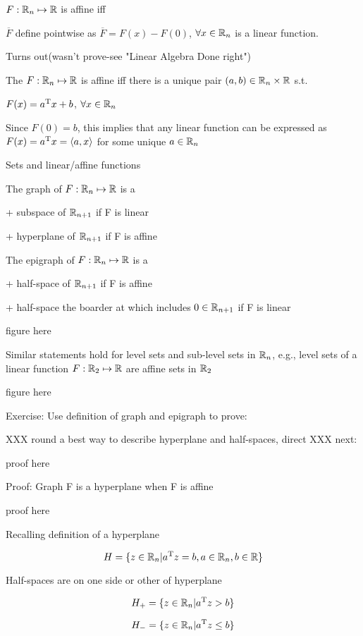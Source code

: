 $F:\mathbb{R}_{n}\mapsto\mathbb{R}$ is affine iff

$\overline{F}$ define pointwise as $\overline{F}=F(x)-F(0)$, $\forall x\in\mathbb{R}_{n}$ is a linear function.


Turns out(wasn't prove-see "Linear Algebra Done right")

The $F:\mathbb{R}_{n}\mapsto\mathbb{R}$ is affine iff there is a unique pair $(a,b)\in\mathbb{R}_{n}\times\mathbb{R}$  s.t. 

$F(x)=a^{{\rm T}} x+b$,  $\forall x\in\mathbb{R}_{n}$

Since $F(0)=b$, this implies that any linear function can be expressed as $F(x)=a^{{\rm T}} x=\langle a,x\rangle$ for some unique $a\in\mathbb{R}_{n}$


Sets and linear/affine functions

The graph of $F:\mathbb{R}_{n}\mapsto\mathbb{R}$ is a 

+ subspace of $\mathbb{R}_{n+1}$ if F is linear

+ hyperplane of $\mathbb{R}_{n+1}$ if F is affine


The epigraph of $F:\mathbb{R}_{n}\mapsto\mathbb{R}$ is a 

+ half-space of $\mathbb{R}_{n+1}$ if F is affine

+ half-space the boarder at which includes $0\in\mathbb{R}_{n+1}$ if F is linear

figure here


Similar statements hold for level sets and sub-level sets in $\mathbb{R}_{n}$, e.g., level sets of a linear function $F:\mathbb{R}_{2}\mapsto\mathbb{R}$ are affine sets in $\mathbb{R}_{2}$

figure here


Exercise: Use definition of graph and epigraph to prove:

XXX round a best way to describe hyperplane and half-spaces, direct XXX next:

proof here


Proof: Graph F is a hyperplane when F is affine

proof here




Recalling definition of a hyperplane

$$H=\{z\in\mathbb{R}_{n}|a^{{\rm T}} z=b,a\in\mathbb{R}_{n}, b\in\mathbb{R} \}$$

Half-spaces are on one side or other of hyperplane

$$H_{+}=\{z\in\mathbb{R}_{n}|a^{{\rm T}} z>b\}$$

$$H_{-}=\{z\in\mathbb{R}_{n}|a^{{\rm T}} z\leq b\}$$

